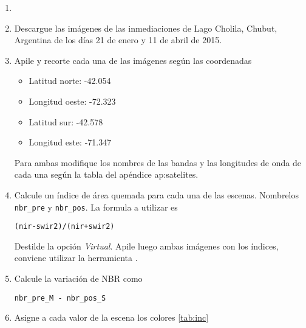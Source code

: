 \begin{enumerate}
\item \item Descargue las imágenes de las inmediaciones de Lago Cholila, Chubut, Argentina de los días 21 de enero y 11 de abril de 2015.

\item Apile y recorte cada una de las imágenes según las coordenadas

\begin{itemize}
    \item Latitud norte: -42.054
    \item Longitud oeste: -72.323
    \item Latitud sur: -42.578
    \item Longitud este: -71.347
\end{itemize}

Para ambas modifique los nombres de las bandas y las longitudes de onda de cada una según la tabla del apéndice ap:satelites.

\item Calcule un índice de área quemada para cada una de las escenas. Nombrelos \texttt{nbr\_pre} y \texttt{nbr\_pos}. La formula a utilizar es

\begin{verbatim}
(nir-swir2)/(nir+swir2)
\end{verbatim}

Destilde la opción \emph{Virtual}. Apile luego ambas imágenes con los índices, conviene utilizar la herramienta .

\item Calcule la variación de NBR como

\begin{verbatim}
nbr_pre_M - nbr_pos_S
\end{verbatim}

\item Asigne a cada valor de la escena los colores \ref{tab:inc}


\end{enumerate}
